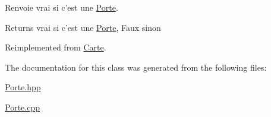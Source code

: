 Renvoie vrai si c'est une \hyperlink{class_porte}{Porte}. 

\begin{DoxyReturn}{Returns}
vrai si c'est une \hyperlink{class_porte}{Porte}, Faux sinon 
\end{DoxyReturn}


Reimplemented from \hyperlink{class_carte_af0156ad1b4b87414df65caddd310212a}{Carte}.



The documentation for this class was generated from the following files\-:\begin{DoxyCompactItemize}
\item 
\hyperlink{_porte_8hpp}{Porte.\-hpp}\item 
\hyperlink{_porte_8cpp}{Porte.\-cpp}\end{DoxyCompactItemize}
